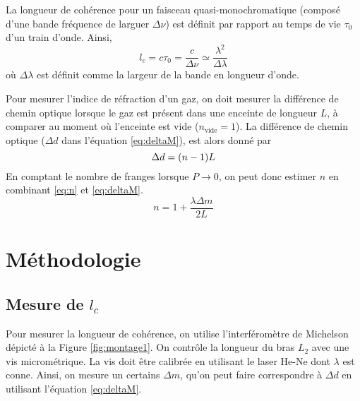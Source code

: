 \documentclass[10pt,letterpaper,twocolumn]{article}
\DeclarePairedDelimiter\autobracket{(}{)}
\newcommand{\br}[1]{\autobracket*{#1}}
\begin{document}
La longueur de cohérence pour un faisceau quasi-monochromatique (composé d'une bande fréquence de larguer $\Delta \nu$) est définit par rapport au temps de vie $\tau_0$ d'un train d'onde. Ainsi,
\begin{equation}\label{eq:lc}
	l_c = c\tau_0 = \frac{c}{\Delta \nu} \simeq \frac{\lambda^2}{\Delta \lambda}
\end{equation}
où $\Delta \lambda$ est définit comme la largeur de la bande en longueur d'onde.\par
Pour mesurer l'indice de réfraction d'un gaz, on doit mesurer la différence de chemin optique lorsque le gaz est présent dans une enceinte de longueur $L$, à comparer au moment où l'enceinte est vide ($n_{\text{vide}} = 1$). La différence de chemin optique ($\Delta d$ dans l'équation \ref{eq:deltaM}), est alors donné par
\begin{equation}\label{eq:n}
	\Delta d = \br{n - 1}L
\end{equation}
En comptant le nombre de franges lorsque $P \rightarrow 0$, on peut donc estimer $n$ en combinant \eqref{eq:n} et \eqref{eq:deltaM}. 
\begin{equation}\label{eq:nExp}
	n = 1 + \frac{\lambda \Delta m}{2 L}
\end{equation}

\par


\section{Méthodologie}\label{sec:metho} %

\subsection{Mesure de $l_c$}
Pour mesurer la longueur de cohérence, on utilise l'interféromètre de Michelson dépicté à la Figure \ref{fig:montage1}. On contrôle la longueur du bras $L_2$ avec une vis micrométrique. La vis doit être calibrée en utilisant le laser He-Ne dont $\lambda$ est conne. Ainsi, on mesure un certains $\Delta m$, qu'on peut faire correspondre à $\Delta d$ en utilisant l'équation \eqref{eq:deltaM}.
\end{document}
